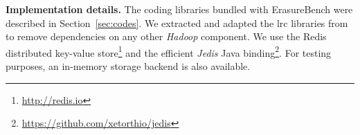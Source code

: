 \textbf{Implementation details.}
The coding libraries bundled with ErasureBench were described in Section~\ref{sec:codes}. 
We extracted and adapted the \ac{lrc} libraries from \autocite{XorbasVLDB} to remove dependencies on any other \textit{Hadoop} component. 
We use the Redis distributed key-value store\footnote{\url{http://redis.io}} and the efficient \textit{Jedis} Java binding\footnote{\url{https://github.com/xetorthio/jedis}}.
For testing purposes, an in-memory storage backend is also available.

